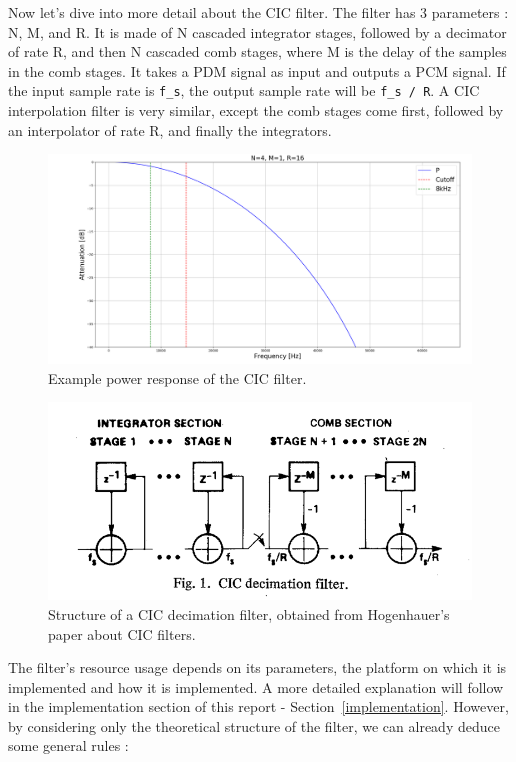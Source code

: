 \documentclass[]{report}
\begin{document}
Now let's dive into more detail about the CIC filter. The filter has 3 parameters : N, M, and R. It is made of N cascaded integrator stages, followed by a decimator of rate R, and then N cascaded comb stages, where M is the delay of the samples in the comb stages. It takes a PDM signal as input and outputs a PCM signal. If the input sample rate is \texttt{f\_s}, the output sample rate will be \texttt{f\_s / R}. A CIC interpolation filter is very similar, except the comb stages come first, followed by an interpolator of rate R, and finally the integrators.

\begin{figure}[H]
	\centering
	\includegraphics[width=1.0\linewidth]{Pictures/CIC_power_resp.png}
	\caption{Example power response of the CIC filter.}
\end{figure}

\begin{figure}[H]
\centering
\includegraphics[width=0.9\linewidth]{Pictures/CIC_structure.png}
\caption{Structure of a CIC decimation filter, obtained from Hogenhauer's paper about CIC filters.}
\end{figure}

The filter's resource usage depends on its parameters, the platform on which it is implemented and how it is implemented. A more detailed explanation will follow in the implementation section of this report - Section~\ref{implementation}. However, by considering only the theoretical structure of the filter, we can already deduce some general rules :
\end{document}
